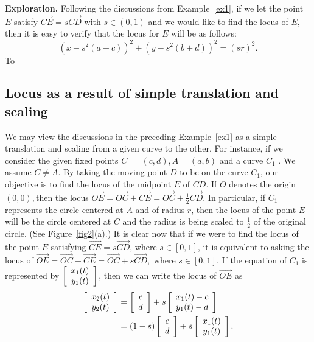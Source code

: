 \documentclass[12pt,a4paper]{article}%
\begin{document}
\textbf{Exploration.} Following the discussions from Example~\ref{ex1}, if we let the
point $E$ satisfy $\overrightarrow{CE}=s\overrightarrow{CD}$ with
$s\in\left(  0,1\right)  $ and we would like to find the locus of $E,$ then it
is easy to verify that the locus for $E$ will be as follows:%
\[
\left(  x-s^{2}\left(  a+c\right)  \right)  ^{2}+\left(  y-s^{2}\left(
b+d\right)  \right)  ^{2}=\left(  sr\right)  ^{2}.
\]
To 

\subsection{Locus as a result of simple translation and scaling} \label{ssec2-2}

We may view the discussions in the preceding Example~\ref{ex1} as a simple
translation and scaling from a given curve to the other. For instance, if we
consider the given fixed points $C=$ $(c,d),A=(a,b)$ and a curve $C_{1}$ . We
assume $C\neq A.$ By taking the moving point $D$ to be on the curve $C_{1} $,
our objective is to find the locus of the midpoint $E$ of $CD.$ If $O$ denotes
the origin $(0,0),$then the locus $\overrightarrow{OE}=\overrightarrow
{OC}+\overrightarrow{CE}=\overrightarrow{OC}+\frac{1}{2}\overrightarrow{CD}.$
In particular, if $C_{1}$ represents the circle centered at $A$ and of radius
$r$, then the locus of the point $E$ will be the circle centered at $C$ and the radius is
being scaled to $\frac{1}{2}$ of the original circle. (See Figure~\ref{fig2}(a).) It is
clear now that if we were to find the locus of the point $E$ satisfying
$\overrightarrow{CE}=s\overrightarrow{CD}$, where $s\in[0,1]$, it is
equivalent to asking the locus of $\overrightarrow{OE}=\overrightarrow
{OC}+\overrightarrow{CE}=\overrightarrow{OC}+s\overrightarrow{CD},$ where
$s\in[0,1]$. If the equation of $C_{1}$ is represented by
$\left[
\begin{array}
[c]{c}%
x_{1}(t)\\
y_{1}(t)
\end{array}
\right]$, then we can write the locus of $\overrightarrow{OE}$ as
\begin{align*}
\left[
\begin{array}
[c]{c}%
x_{2}(t)\\
y_{2}(t)
\end{array}
\right]   & =\left[
\begin{array}
[c]{c}%
c\\
d
\end{array}
\right]  +s\left[
\begin{array}
[c]{c}%
x_{1}(t)-c\\
y_{1}(t)-d
\end{array}
\right] \\
& =(1-s)\left[
\begin{array}
[c]{c}%
c\\
d
\end{array}
\right]  +s\left[
\begin{array}
[c]{c}%
x_{1}(t)\\
y_{1}(t)
\end{array}
\right]  .
\end{align*}
\end{document}
